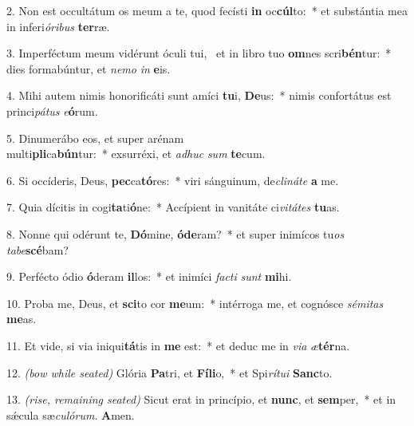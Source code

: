	2. Non est occultátum os meum a te, quod fecísti \textbf{in} oc\textbf{cúl}to:~* et substántia mea in inferi\textit{ó}\textit{ri}\textit{bus} \textbf{ter}ræ.

	3. Imperféctum meum vidérunt óculi tui,~{\color{red}\GreDagger} et in libro tuo \textbf{om}nes scri\textbf{bén}tur:~* dies formabúntur, et \textit{ne}\textit{mo} \textit{in} \textbf{e}is.
	
	4. Mihi autem nimis honorificáti sunt amíci \textbf{tu}i, \textbf{De}us:~* nimis confortátus est princi\textit{pá}\textit{tus} \textit{e}\textbf{ó}rum.
	
	5. Dinumerábo eos, et super arénam\\ multi\textbf{pli}ca\textbf{bún}tur:~* exsurréxi, et \textit{ad}\textit{huc} \textit{sum} \textbf{te}cum.
	
	6. Si occíderis, Deus, \textbf{pec}ca\textbf{tó}res:~* viri sánguinum, de\textit{cli}\textit{ná}\textit{te} \textbf{a} me.
	
	7. Quia dícitis in cogi\textbf{ta}ti\textbf{ó}ne:~* Accípient in vanitáte ci\textit{vi}\textit{tá}\textit{tes} \textbf{tu}as.
	
	8. Nonne qui odérunt te, \textbf{Dó}mine, \textbf{ó}\textbf{de}ram?~* et super inimícos tu\textit{os} \textit{ta}\textit{be}\textbf{scé}bam?
	
	9. Perfécto ódio \textbf{ó}deram \textbf{il}los:~* et inimíci \textit{fac}\textit{ti} \textit{sunt} \textbf{mi}hi.
	
	10. Proba me, Deus, et \textbf{sci}to cor \textbf{me}um:~* intérroga me, et cognósce \textit{sé}\textit{mi}\textit{tas} \textbf{me}as.
	
	11. Et vide, si via iniqui\textbf{tá}tis in \textbf{me} est:~* et deduc me in \textit{vi}\textit{a} \textit{æ}\textbf{tér}na.
	
	12. {\color{red}\textit{(bow while seated)}} Glória \textbf{Pa}tri, et \textbf{Fí}\textbf{li}o,~* et Spi\textit{rí}\textit{tu}\textit{i} \textbf{Sanc}to.
	
	13. {\color{red}\textit{(rise, remaining seated)}} Sicut erat in princípio, et \textbf{nunc}, et \textbf{sem}per,~* et in s\'{\ae}cula sæ\textit{cu}\textit{ló}\textit{rum}. \textbf{A}men.